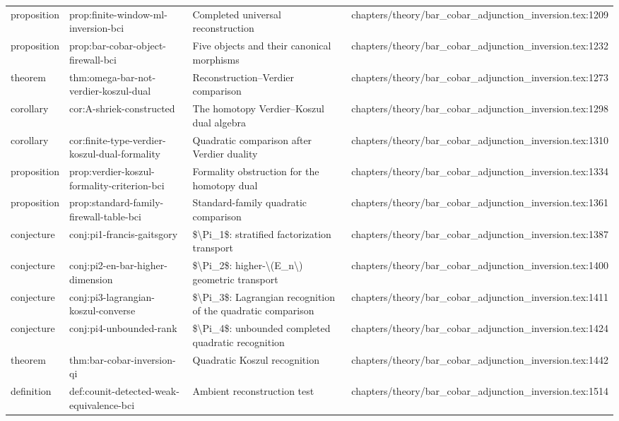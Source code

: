 \documentclass[11pt]{article}
\begin{document}
\begin{longtable}{L{0.10\textwidth}L{0.26\textwidth}L{0.42\textwidth}L{0.22\textwidth}}
proposition & prop:finite-window-ml-inversion-bci & Completed universal reconstruction & chapters/theory/bar\_cobar\_adjunction\_inversion.tex:1209\\
proposition & prop:bar-cobar-object-firewall-bci & Five objects and their canonical morphisms & chapters/theory/bar\_cobar\_adjunction\_inversion.tex:1232\\
theorem & thm:omega-bar-not-verdier-koszul-dual & Reconstruction--Verdier comparison & chapters/theory/bar\_cobar\_adjunction\_inversion.tex:1273\\
corollary & cor:A-shriek-constructed & The homotopy Verdier--Koszul dual algebra & chapters/theory/bar\_cobar\_adjunction\_inversion.tex:1298\\
corollary & cor:finite-type-verdier-koszul-dual-formality & Quadratic comparison after Verdier duality & chapters/theory/bar\_cobar\_adjunction\_inversion.tex:1310\\
proposition & prop:verdier-koszul-formality-criterion-bci & Formality obstruction for the homotopy dual & chapters/theory/bar\_cobar\_adjunction\_inversion.tex:1334\\
proposition & prop:standard-family-firewall-table-bci & Standard-family quadratic comparison & chapters/theory/bar\_cobar\_adjunction\_inversion.tex:1361\\
conjecture & conj:pi1-francis-gaitsgory & \$\textbackslash{}Pi\_1\$: stratified factorization transport & chapters/theory/bar\_cobar\_adjunction\_inversion.tex:1387\\
conjecture & conj:pi2-en-bar-higher-dimension & \$\textbackslash{}Pi\_2\$: higher-\textbackslash{}(E\_n\textbackslash{}) geometric transport & chapters/theory/bar\_cobar\_adjunction\_inversion.tex:1400\\
conjecture & conj:pi3-lagrangian-koszul-converse & \$\textbackslash{}Pi\_3\$: Lagrangian recognition of the quadratic comparison & chapters/theory/bar\_cobar\_adjunction\_inversion.tex:1411\\
conjecture & conj:pi4-unbounded-rank & \$\textbackslash{}Pi\_4\$: unbounded completed quadratic recognition & chapters/theory/bar\_cobar\_adjunction\_inversion.tex:1424\\
theorem & thm:bar-cobar-inversion-qi & Quadratic Koszul recognition & chapters/theory/bar\_cobar\_adjunction\_inversion.tex:1442\\
definition & def:counit-detected-weak-equivalence-bci & Ambient reconstruction test & chapters/theory/bar\_cobar\_adjunction\_inversion.tex:1514\\

\end{longtable}
\end{document}

